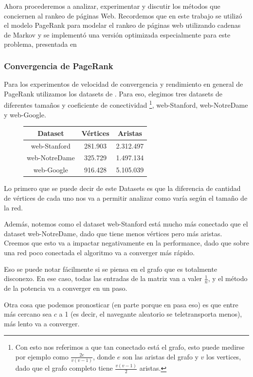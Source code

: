 Ahora procederemos a analizar, experimentar y discutir los métodos que conciernen al rankeo de páginas Web. Recordemos que en este trabajo se utilizó el modelo PageRank para modelar el rankeo de páginas web utilizando cadenas de Markov y se implementó una versión optimizada especialmente para este problema, presentada en \cite{Kamvar2003}

\subsubsection{Convergencia de PageRank}
Para los experimentos de velocidad de convergencia y rendimiento en general de PageRank utilizamos los datasets de \cite{SNAP}. Para eso, elegimos tres datasets de diferentes tamaños y coeficiente de conectividad \footnote{Con esto nos referimos a que tan conectado está el grafo, esto puede medirse por ejemplo como $\frac{2e}{v(v-1)}$, donde $e$ son las aristas del grafo y $v$ los vertices, dado que el grafo completo tiene $\frac{v(v-1)}{2}$ aristas.}, web-Stanford, web-NotreDame y web-Google.

\begin{figure}[H]
\centering
\begin{tabular}{| c | c | c |}
  \hline
  Dataset & Vértices & Aristas \\ \hline \hline
  web-Stanford & 281.903 & 2.312.497 \\ \hline
  web-NotreDame & 325.729 & 1.497.134 \\ \hline
  web-Google & 916.428 & 5.105.039 \\ \hline
\end{tabular}
\end{figure}


Lo primero que se puede decir de este Datasets es que la diferencia de cantidad de vértices de cada uno nos va a permitir analizar como varía según el tamaño de la red. 

Además, notemos como el dataset web-Stanford está mucho más conectado que el dataset web-NotreDame, dado que tiene menos vértices pero más aristas. Creemos que esto va a impactar negativamente en la performance, dado que sobre una red poco conectada el algoritmo va a converger más rápido.

Eso se puede notar fácilmente si se piensa en el grafo que es totalmente disconexo. En ese caso, todas las entradas de la matriz van a valer $\frac1n$, y el método de la potencia va a converger en un paso.

Otra cosa que podemos pronosticar (en parte porque en \cite{Kamvar2003} pasa eso) es que entre más cercano sea $c$ a 1 (es decir, el navegante aleatorio se teletransporta menos), más lento va a converger.

